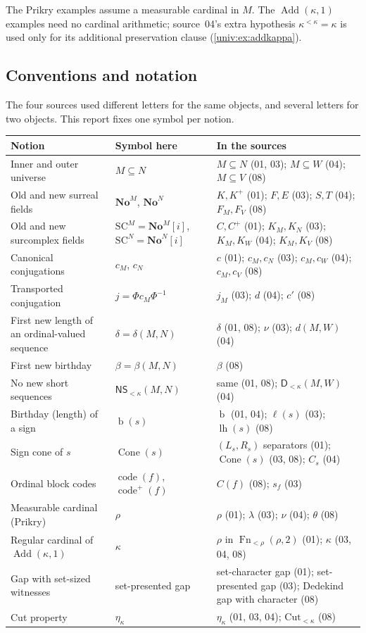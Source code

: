 \documentclass[11pt,letterpaper]{article}
\numberwithin{equation}{section}
\theoremstyle{definition}
\theoremstyle{remark}
\newcommand{\No}{\mathbf{No}}
\newcommand{\SC}{\mathrm{SC}}
\newcommand{\NoM}{\No^{M}}
\newcommand{\NoN}{\No^{N}}
\newcommand{\SCM}{\SC^{M}}
\newcommand{\SCN}{\SC^{N}}
\newcommand{\bd}{\operatorname{b}}
\newcommand{\Cone}{\operatorname{Cone}}
\newcommand{\code}{\operatorname{code}}
\newcommand{\codeplus}{\operatorname{code}^{+}}
\newcommand{\Add}{\operatorname{Add}}
\newcommand{\NS}{\mathsf{NS}}
\begin{document}
The Prikry examples assume a measurable cardinal in $M$. The
$\Add(\kappa,1)$ examples need no cardinal arithmetic; source~04's extra
hypothesis $\kappa^{<\kappa}=\kappa$ is used only for its additional
preservation clause (\cref{univ:ex:addkappa}).

\subsection{Conventions and notation}\label{univ:sub:notation}

The four sources used different letters for the same objects, and several
letters for two objects. This report fixes one symbol per notion.

\begin{center}\small
\begin{longtable}{@{}P{0.33\textwidth}P{0.2\textwidth}P{0.38\textwidth}@{}}
\toprule
Notion & Symbol here & In the sources\\
\midrule
\endhead
Inner and outer universe & $M\subseteq N$ & $M\subseteq N$ (01, 03); $M\subseteq W$ (04); $M\subseteq V$ (08)\\
Old and new surreal fields & $\NoM$, $\NoN$ & $K,K^+$ (01); $F,E$ (03); $S,T$ (04); $F_M,F_V$ (08)\\
Old and new surcomplex fields & $\SCM=\NoM[i]$, $\SCN=\NoN[i]$ & $C,C^+$ (01); $K_M,K_N$ (03); $K_M,K_W$ (04); $K_M,K_V$ (08)\\
Canonical conjugations & $c_M$, $c_N$ & $c$ (01); $c_M,c_N$ (03); $c_M,c_W$ (04); $c_M,c_V$ (08)\\
Transported conjugation & $j=\Phi c_M\Phi^{-1}$ & $j_M$ (03); $d$ (04); $c'$ (08)\\
First new length of an ordinal-valued sequence & $\delta=\delta(M,N)$ & $\delta$ (01, 08); $\nu$ (03); $d(M,W)$ (04)\\
First new birthday & $\beta=\beta(M,N)$ & $\beta$ (08)\\
No new short sequences & $\NS_{<\kappa}(M,N)$ & same (01, 08); $\mathsf D_{<\kappa}(M,W)$ (04)\\
Birthday (length) of a sign & $\bd(s)$ & $\bd$ (01, 04); $\ell(s)$ (03); $\operatorname{lh}(s)$ (08)\\
Sign cone of $s$ & $\Cone(s)$ & $(L_s,R_s)$ separators (01); $\Cone(s)$ (03, 08); $C_s$ (04)\\
Ordinal block codes & $\code(f)$, $\codeplus(f)$ & $C(f)$ (08); $s_f$ (03)\\
Measurable cardinal (Prikry) & $\rho$ & $\rho$ (01); $\lambda$ (03); $\nu$ (04); $\theta$ (08)\\
Regular cardinal of $\Add(\kappa,1)$ & $\kappa$ & $\rho$ in $\operatorname{Fn}_{<\rho}(\rho,2)$ (01); $\kappa$ (03, 04, 08)\\
Gap with set-sized witnesses & set-presented gap & set-character gap (01); set-presented gap (03); Dedekind gap with character (08)\\
Cut property & $\eta_\kappa$ & $\eta_\kappa$ (01, 03, 04); $\mathrm{Cut}_{<\kappa}$ (08)\\
\bottomrule
\end{longtable}
\end{center}
\end{document}
